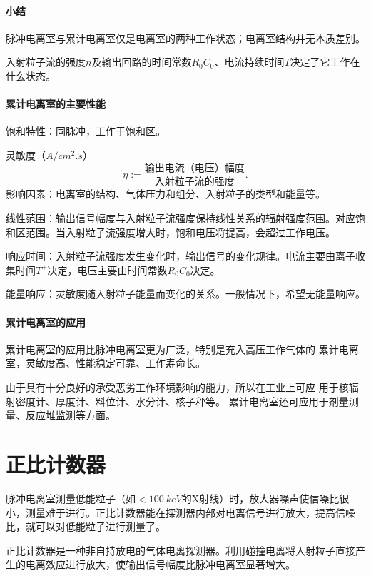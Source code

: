 \paragraph{小结}
\begin{compactenum}
	\item 脉冲电离室与累计电离室仅是电离室的两种工作状态；电离室结构并无本质差别。
	\item 入射粒子流的强度$n$及输出回路的时间常数$R_0C_0$、电流持续时间$T$决定了它工作在什么状态。
\end{compactenum}
\paragraph{累计电离室的主要性能}
饱和特性：同脉冲，工作于饱和区。

灵敏度（$\si{A/cm^2.s}$）
\[
	\eta:=\frac{\text{输出电流（电压）幅度}}{\text{入射粒子流的强度}}.
\]
影响因素：电离室的结构、气体压力和组分、入射粒子的类型和能量等。

线性范围：输出信号幅度与入射粒子流强度保持线性关系的辐射强度范围。对应饱和区范围。当入射粒子流强度增大时，饱和电压将提高，会超过工作电压。

响应时间：入射粒子流强度发生变化时，输出信号的变化规律。电流主要由离子收集时间$T^+$决定，电压主要由时间常数$R_0C_0$决定。

能量响应：灵敏度随入射粒子能量而变化的关系。一般情况下，希望无能量响应。
\paragraph{累计电离室的应用}
累计电离室的应用比脉冲电离室更为广泛，特别是充入高压工作气体的
累计电离室，灵敏度高、性能稳定可靠、工作寿命长。

由于具有十分良好的承受恶劣工作环境影响的能力，所以在工业上可应
用于核辐射密度计、厚度计、料位计、水分计、核子秤等。
累计电离室还可应用于剂量测量、反应堆监测等方面。

\section{正比计数器}

脉冲电离室测量低能粒子（如$<\SI{100}{keV}$的X射线）时，放大器噪声使信噪比很小，测量难于进行。正比计数器能在探测器内部对电离信号进行放大，提高信噪比，就可以对低能粒子进行测量了。

正比计数器是一种非自持放电的气体电离探测器。利用碰撞电离将入射粒子直接产生的电离效应进行放大，使输出信号幅度比脉冲电离室显著增大。

